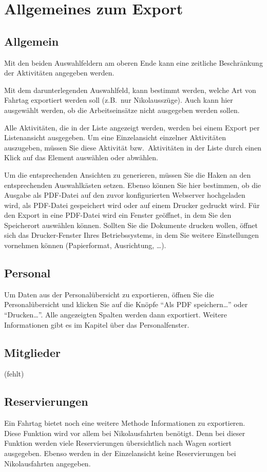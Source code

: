 \chapter{Allgemeines zum Export}
\section{Allgemein}
Mit den beiden Auswahlfeldern am oberen Ende kann eine zeitliche Beschränkung der Aktivitäten angegeben werden.

Mit dem darunterlegenden Auswahlfeld, kann bestimmt werden, welche Art von Fahrtag exportiert werden soll (z.B.\ nur Nikolausszüge).
Auch kann hier ausgewählt werden, ob die Arbeitseinsätze nicht ausgegeben werden sollen.

Alle Aktivitäten, die in der Liste angezeigt werden, werden bei einem Export per Listenansicht ausgegeben.
Um eine Einzelansicht einzelner Aktivitäten auszugeben, müssen Sie diese Aktivität bzw.\ Aktivitäten in der Liste durch einen Klick auf das Element auswählen oder abwählen.

Um die entsprechenden Ansichten zu generieren, müssen Sie die Haken an den entsprechenden Auswahlkästen setzen.
Ebenso können Sie hier bestimmen, ob die Ausgabe als PDF-Datei auf den zuvor konfigurierten Webserver hochgeladen wird, als PDF-Datei gespeichert wird oder auf einem Drucker gedruckt wird.
Für den Export in eine PDF-Datei wird ein Fenster geöffnet, in dem Sie den Speicherort auswählen können.
Sollten Sie die Dokumente drucken wollen, öffnet sich das Drucker-Fenster Ihres Betriebssystems, in dem Sie weitere Einstellungen vornehmen können (Papierformat, Ausrichtung, \dots).


\section{Personal}
Um Daten aus der Personalübersicht zu exportieren, öffnen Sie die Personalübersicht und klicken Sie auf die Knöpfe ``Als PDF speichern\dots'' oder ``Drucken\dots''.
Alle angezeigten Spalten werden dann exportiert.
Weitere Informationen gibt es im Kapitel über das Personalfenster.


\section{Mitglieder}
(fehlt)


\section{Reservierungen}
Ein Fahrtag bietet noch eine weitere Methode Informationen zu exportieren.
Diese Funktion wird vor allem bei Nikolausfahrten benötigt.
Denn bei dieser Funktion werden viele Reservierungen übersichtlich nach Wagen sortiert ausgegeben.
Ebenso werden in der Einzelansicht keine Reservierungen bei Nikolausfahrten angegeben.

